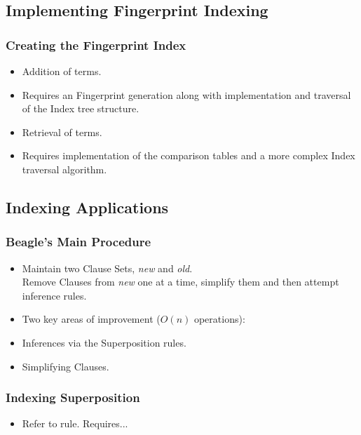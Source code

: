 \documentclass[10pt,xcolor={dvipsnames}]{beamer}
\begin{document}
\begin{NoHyper}
\subsection{Implementing Fingerprint Indexing}
\begin{frame}
  \frametitle{Creating the Fingerprint Index}
  \begin{itemize}
  \item<1-> Addition of terms.
  \item<2-> Requires an Fingerprint generation along with implementation and traversal of the Index tree structure.
  \item<3-> Retrieval of terms.
  \item<4-> Requires implementation of the comparison tables and a more complex
  Index traversal algorithm.
  \end{itemize}
\end{frame}

\subsection{Indexing Applications}
\begin{frame}
  \frametitle{Beagle's Main Procedure}
  \begin{itemize}
  \item<1-> 
Maintain two Clause Sets, \emph{new} and \emph{old}.\\
Remove Clauses from \emph{new} one at a time, simplify them and then
attempt inference rules.
  \item<2-> Two key areas of improvement ($O(n)$ operations):
  \item<2-> Inferences via the Superposition rules.
  \item<2-> Simplifying Clauses.
  \end{itemize}
\end{frame}

\begin{frame}
  \frametitle{Indexing Superposition}
  \begin{itemize}
  \item<1-> Refer to rule. Requires...
  \end{itemize}
\end{frame}


\end{NoHyper}
\end{document}
